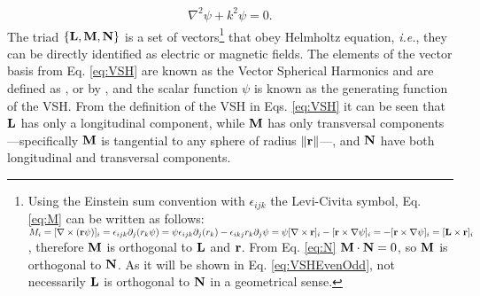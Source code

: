 \begin{align}
	\nabla^2 \psi + k^2 \psi = 0.
\label{eq:HelmoltzScalar}
\end{align}
%
The triad $\left\{\vb{L},\vb{M},\vb{N}\right\}$ is a set of vectors\footnote{%
		Using the Einstein sum convention with $\epsilon_{ijk}$ the Levi-Civita symbol, Eq. \eqref{eq:M} can be written as follows: %
	 		$M_i = [\nabla\times(\vb{r}\psi)]_i
	 		=  \epsilon_{ijk}\partial_j(r_k\psi)
	 		=\psi\epsilon_{ijk}\partial_j(r_k) -\epsilon_{ikj}r_k\partial_j\psi
	 		=\psi[\nabla\times\vb{r}]_i - [\vb{r}\times\nabla\psi]_i
	 		= - [\vb{r}\times\nabla\psi]_i
	 		= [\vb{L}\times\vb{r}]_i$,%
	 	therefore $\vb{M}$ is orthogonal to $\vb{L}$ and $\vb{r}$. From Eq. \eqref{eq:N} $\vb{M}\cdot\vb{N}=0$, so $\vb{M}$ is orthogonal to $\vb{N}$. As it will be shown in Eq. \eqref{eq:VSHEvenOdd}, not necessarily $\vb{L}$ is orthogonal to $\vb{N}$ in a geometrical sense.
	} %
 that obey Helmholtz equation, \textit{i.e.}, they can be directly identified as electric or magnetic fields. The elements of the vector basis from Eq. \eqref{eq:VSH}   are known as the Vector Spherical Harmonics and are defined as  \citeauthor{stratton_electromagnetic_2012} \cite{stratton_electromagnetic_2012}, or by \citeauthor{bohren_absorption_1983} \cite{bohren_absorption_1983}, and the scalar function $\psi$ is known as the generating function of the VSH. From the definition of the VSH in Eqs. \eqref{eq:VSH} it can be seen that $\vb{L}$ has only a longitudinal component, while $\vb{M}$ has only transversal components ---specifically $\vb{M}$ is tangential to any sphere of radius $\norm{\vb{r}}$---, and $\vb{N}$ have both longitudinal and transversal components.

